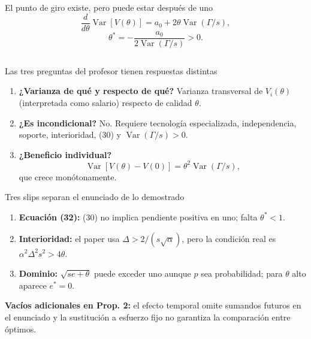 \documentclass[aspectratio=169,11pt]{beamer}
\begin{document}
\begin{frame}{El punto de giro existe, pero puede estar después de uno}
  \[
  \frac{d}{d\theta}\operatorname{Var}[V(\theta)]
  =a_0+2\theta\operatorname{Var}(\Gamma/s),
  \]
  \[
  \theta^*=-\frac{a_0}{2\operatorname{Var}(\Gamma/s)}>0.
  \]
  \begin{columns}[T,onlytextwidth]
  \end{columns}
\end{frame}

\begin{frame}{Las tres preguntas del profesor tienen respuestas distintas}
  \small
  \begin{enumerate}
    \item \textbf{¿Varianza de qué y respecto de qué?} Varianza transversal de
      $V_i(\theta)$ (interpretada como salario) respecto de calidad $\theta$.
    \item \textbf{¿Es incondicional?} No. Requiere tecnología especializada,
      independencia, soporte, interioridad, (30) y
      $\operatorname{Var}(\Gamma/s)>0$.
    \item \textbf{¿Beneficio individual?}
      \[
      \operatorname{Var}[V(\theta)-V(0)]
      =\theta^2\operatorname{Var}(\Gamma/s),
      \]
      que crece monótonamente.
  \end{enumerate}
\end{frame}

\begin{frame}{Tres slips separan el enunciado de lo demostrado}
  \small
  \begin{enumerate}
    \item \textbf{Ecuación (32):} (30) no implica pendiente positiva en uno;
      falta $\theta^*<1$.
    \item \textbf{Interioridad:} el paper usa $\Delta>2/(s\sqrt\alpha)$, pero
      la condición real es $\alpha^2\Delta^2s^2>4\theta$.
    \item \textbf{Dominio:} $\sqrt{se+\theta}$ puede exceder uno aunque $p$ sea
      probabilidad; para $\theta$ alto aparece $e^*=0$.
  \end{enumerate}
  \medskip
  \textbf{Vacíos adicionales en Prop. 2:} el efecto temporal omite sumandos
  futuros en el enunciado y la sustitución a esfuerzo fijo no garantiza la
  comparación entre óptimos.
\end{frame}
\end{document}
